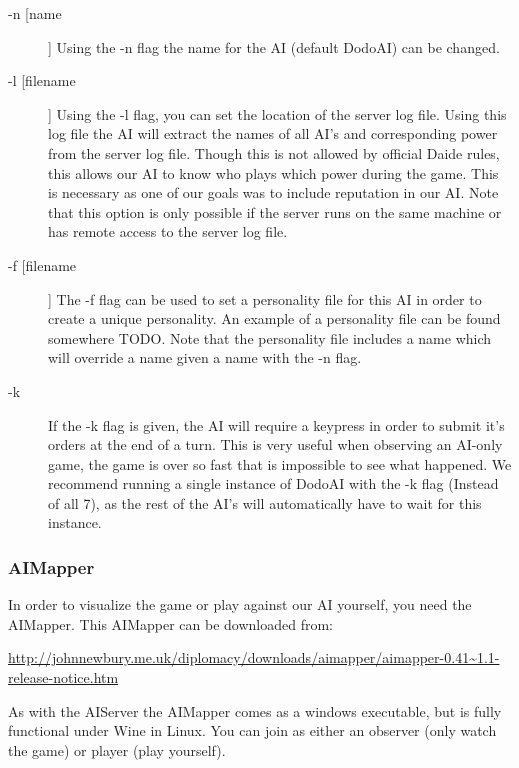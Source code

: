 \documentclass[a4paper]{article} %
\begin{document}
\begin{description}
\item[-n [name]] Using the -n flag the name for the AI (default DodoAI) can be changed. 
\item[-l [filename]] Using the -l flag, you can set the location of the server log file. Using this log file the AI will extract the names of all AI's and corresponding power from the server log file. Though this is not allowed by official Daide rules, this allows our AI to know who plays which power during the game. This is necessary as one of our goals was to include reputation in our AI. Note that this option is only possible if the server runs on the same machine or has remote access to the server log file.  
\item[-f [filename]] The -f flag can be used to set a personality file for this AI in order to create a unique personality. An example of a personality file can be found somewhere TODO. Note that the personality file includes a name which will override a name given a name with the -n flag.  %
\item[-k] If the -k flag is given, the AI will require a keypress in order to submit it's orders at the end of a turn. This is very useful when observing an AI-only game, the game is over so fast that is impossible to see what happened. We recommend running a single instance of DodoAI with the -k flag (Instead of all 7), as the rest of the AI's will automatically have to wait for this instance.  
\end{description} 

\subsubsection{AIMapper}
In order to visualize the game or play against our AI yourself, you need the AIMapper. This AIMapper can be downloaded from: 

\begin{sloppypar}
\noindent\url{http://johnnewbury.me.uk/diplomacy/downloads/aimapper/aimapper-0.41~1.1-release-notice.htm}
\end{sloppypar}

As with the AIServer the AIMapper comes as a windows executable, but is fully functional under Wine in Linux. You can join as either an observer (only watch the game) or player (play yourself). 









{}
\end{document}
